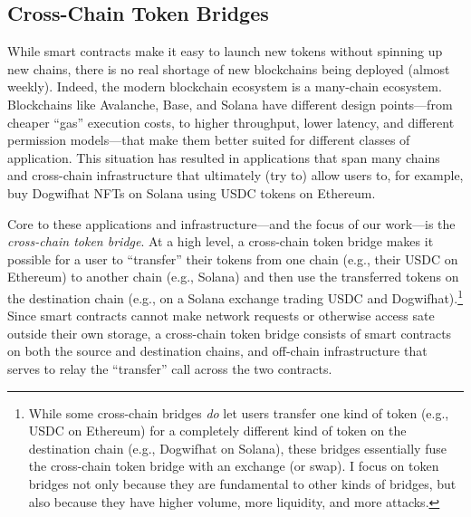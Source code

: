 


\subsection{Cross-Chain Token Bridges}
While smart contracts make it easy to launch new tokens without spinning up new
chains, there is no real shortage of new blockchains being deployed (almost weekly).  Indeed,
the modern blockchain ecosystem is a many-chain ecosystem.  Blockchains like
Avalanche, Base, and Solana have different design points---from cheaper ``gas''
execution costs, to higher throughput, lower latency, and different permission
models---that make them better suited for different classes of application.
This situation has resulted in applications that span many chains and cross-chain
infrastructure that ultimately (try to) allow users to, for example, buy
Dogwifhat NFTs on Solana using USDC tokens on Ethereum.

Core to these applications and infrastructure---and the focus of our work---is
the \emph{cross-chain token bridge}.  At a high level, a cross-chain token
bridge makes it possible for a user to ``transfer'' their tokens from one chain
(e.g., their USDC on Ethereum) to another chain (e.g., Solana) and then use the
transferred tokens on the destination chain (e.g., on a Solana exchange trading
USDC and Dogwifhat).\footnote{While some cross-chain bridges \emph{do} let users
transfer one kind of token (e.g., USDC on Ethereum) for a completely different
kind of token on the destination chain (e.g., Dogwifhat on Solana), these bridges
essentially fuse the cross-chain token bridge with an exchange (or swap). I
focus on token bridges not only because they are fundamental to other kinds of
bridges, but also because they have higher volume, more liquidity, and more
attacks.} Since smart contracts cannot make network requests or otherwise
access sate outside their own storage, a cross-chain token bridge consists of
smart contracts on both the source and destination chains, and off-chain
infrastructure that serves to relay the ``transfer'' call across the two
contracts.

